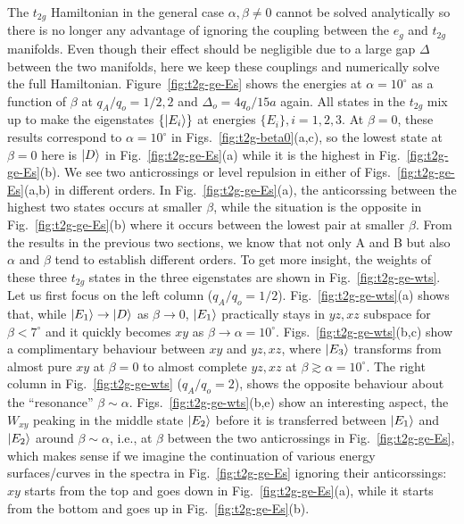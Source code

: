 \documentclass[a4paper,prb,twocolumn]{revtex4-1}  %
\newcommand{\az}[1]{{\color{magenta}{#1}}} %
\begin{document}
The $t_{2g}$ Hamiltonian in the general case $\alpha,\beta\neq 0$ cannot be solved analytically
 so there is no longer any advantage of ignoring the coupling between 
 the $e_{g}$ and $t_{2g}$ manifolds.
Even though their effect should be negligible due to a large gap $\Delta$ between the two manifolds,
here we keep these couplings 
and numerically solve
the full Hamiltonian.
Figure~\ref{fig:t2g-ge-Es}
shows the energies at $\alpha=10^\circ$
as a function of $\beta$
at $q_A/q_o=1/2,2$ and $\Delta_o=4q_o/15a$ again.
All states in the $t_{2g}$ mix up to make the eigenstates $\{\ket{E_i}\}$
at energies $\{E_i\}, i=1,2,3$.
At $\beta=0$, these results correspond to $\alpha=10^\circ$ 
in Figs.~\ref{fig:t2g-beta0}(a,c),
so the lowest state at $\beta=0$
here is $\ket{D}$ in Fig.~\ref{fig:t2g-ge-Es}(a)
while it is the highest in Fig.~\ref{fig:t2g-ge-Es}(b).
We see two anticrossings or level repulsion in either of Figs.~\ref{fig:t2g-ge-Es}(a,b)
in different orders.
In Fig.~\ref{fig:t2g-ge-Es}(a), 
the anticorssing between the highest two states occurs at smaller $\beta$,
while the situation is the opposite in Fig.~\ref{fig:t2g-ge-Es}(b) where 
it occurs between the lowest pair at smaller $\beta$.
From the results in the previous two sections,
we know that not only A and B but also $\alpha$ and $\beta$ tend to establish different orders.
To get more insight, the weights of these three $t_{2g}$ states in the three eigenstates 
are shown in Fig.~\ref{fig:t2g-ge-wts}.
Let us first focus on the left column ($q_A/q_o=1/2$). 
Fig.~\ref{fig:t2g-ge-wts}(a)
shows that, while $\ket{E_1}\to \ket{D}$ as $\beta\to 0$,
$\ket{E_1}$ practically stays in $yz,xz$ subspace
for $\beta<7^\circ$ and it quickly becomes $xy$
as $\beta\to\alpha=10^\circ$.
Figs.~\ref{fig:t2g-ge-wts}(b,c)
show a complimentary behaviour 
between $xy$ and $yz,xz$,
where $\ket{E_3}$
transforms from almost pure $xy$ at $\beta=0$
to almost complete $yz,xz$ at $\beta\gtrsim\alpha=10^\circ$.
The right column
in Fig.~\ref{fig:t2g-ge-wts} ($q_A/q_o=2$),
shows the opposite behaviour 
about the ``resonance'' $\beta\sim\alpha$.
Figs.~\ref{fig:t2g-ge-wts}(b,e)
show an interesting aspect,
the $W_{xy}$ peaking in the middle state $\ket{E_2}$
before it is transferred between $\ket{E_1}$ and $\ket{E_2}$
around $\beta\sim\alpha$,
i.e., at $\beta$
between the two anticrossings in 
Fig.~\ref{fig:t2g-ge-Es},
which makes sense if we imagine the continuation of various energy surfaces/curves
in 
the spectra in Fig.~\ref{fig:t2g-ge-Es}
ignoring their anticorssings:
$xy$ starts from the top and goes down in 
Fig.~\ref{fig:t2g-ge-Es}(a),
while it starts from the bottom and goes up
in Fig.~\ref{fig:t2g-ge-Es}(b).
\end{document}
